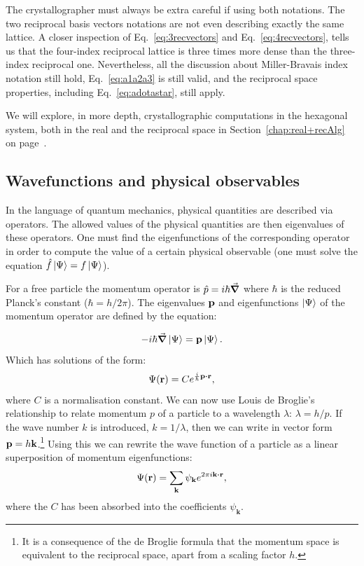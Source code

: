 \label{say:moreDense}
The crystallographer must always be extra careful if using both notations. The two reciprocal basis vectors notations are not even describing exactly the same lattice. A closer inspection of Eq.~\ref{eq:3recvectors} and Eq.~\ref{eq:4recvectors}, tells us that the four-index reciprocal lattice is three times more dense than the three-index reciprocal one. Nevertheless, all the discussion about Miller-Bravais index notation still hold, \ie Eq.~\ref{eq:a1a2a3} is still valid, and the reciprocal space properties, including Eq.~\ref{eq:adotastar}, still apply. 

We will explore, in more depth, crystallographic computations in the hexagonal system, both in the real and the reciprocal space in Section~\ref{chap:real+recAlg} on page~\pageref{chap:real+recAlg}.

\subsection{Wavefunctions and physical observables}
\label{sec:wave}
In the language of quantum mechanics, physical quantities are described via operators. The allowed values of the physical quantities are then eigenvalues of these operators. One must find the eigenfunctions of the corresponding operator in order to compute the value of a certain physical observable (\ie one must solve the equation $\hat{f}\ket{\Psi}=f\ket{\Psi}$).

For a free particle the momentum operator is $\hat{p}=i\hbar\grad$ where $\hbar$ is the reduced Planck's constant ($\hbar = h/2\pi$). The eigenvalues $\vb{p}$ and eigenfunctions $\ket{\Psi}$ of the momentum operator are defined by the equation:

\begin{equation*}
-i\hbar\grad \ket{\Psi}=\vb{p}\ket{\Psi}.
\end{equation*}
Which has solutions of the form:
\begin{equation*}
\Psi(\vb{r})=C e^{\frac{i}{\hbar}\vb{p}\vdot\vb{r}},
\end{equation*}
where $C$ is a normalisation constant.  
We can now use Louis de Broglie's relationship to relate momentum $p$ of a particle to a wavelength $\lambda$: $\lambda = h/p$. If the wave number $k$ is introduced, $k=1/\lambda$, then we can write in vector form $\vb{p}=h\vb{k}$.\footnote{ It is a consequence of the de Broglie formula that the momentum space is equivalent to the reciprocal space, apart from a scaling factor $h$.} Using this we can rewrite the wave function of a particle as a linear superposition of momentum eigenfunctions:
\begin{equation}
\label{eq:psi}
\Psi(\vb{r})=\sum_{\vb{k}} \psi_{\vb{k}} e^{2 \pi i \vb{k}\vdot\vb{r}},
\end{equation}
where the $C$ has been absorbed into the coefficients $\psi_\mathbf{k}$.

